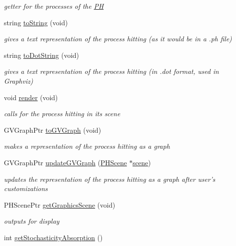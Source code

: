 \begin{DoxyCompactItemize}
\begin{DoxyCompactList}\small\item\em getter for the processes of the \hyperlink{class_p_h}{\-P\-H} \end{DoxyCompactList}\item 
string \hyperlink{class_p_h_ae870206aad796943dffaa6bab1f7f293}{to\-String} (void)
\begin{DoxyCompactList}\small\item\em gives a text representation of the process hitting (as it would be in a .ph file) \end{DoxyCompactList}\item 
string \hyperlink{class_p_h_aa0a7716cb565380f06670517609ee960}{to\-Dot\-String} (void)
\begin{DoxyCompactList}\small\item\em gives a text representation of the process hitting (in .dot format, used in \-Graphviz) \end{DoxyCompactList}\item 
void \hyperlink{class_p_h_af1f67304076aded44a15a30aed6dc652}{render} (void)
\begin{DoxyCompactList}\small\item\em calls for the process hitting in its scene \end{DoxyCompactList}\item 
\-G\-V\-Graph\-Ptr \hyperlink{class_p_h_a220fd9fdc673988edb461b02a90edb1b}{to\-G\-V\-Graph} (void)
\begin{DoxyCompactList}\small\item\em makes a representation of the process hitting as a graph \end{DoxyCompactList}\item 
\-G\-V\-Graph\-Ptr \hyperlink{class_p_h_afbd5cbabc39a0502a95e5c6609a52d58}{update\-G\-V\-Graph} (\hyperlink{class_p_h_scene}{\-P\-H\-Scene} $\ast$\hyperlink{class_p_h_ac8fbe29746ee4097c879be0cf75f3ad7}{scene})
\begin{DoxyCompactList}\small\item\em updates the representation of the process hitting as a graph after user's customizations \end{DoxyCompactList}\item 
\-P\-H\-Scene\-Ptr \hyperlink{class_p_h_aaf75a785bb9bd06cec611f0fb69d05f6}{get\-Graphics\-Scene} (void)
\begin{DoxyCompactList}\small\item\em outputs for display \end{DoxyCompactList}\item 
\hypertarget{class_p_h_a0494ca8a53e983230a9df06fa71043e1}{int \hyperlink{class_p_h_a0494ca8a53e983230a9df06fa71043e1}{get\-Stochasticity\-Absorption} ()}\label{class_p_h_a0494ca8a53e983230a9df06fa71043e1}


\end{DoxyCompactItemize}
